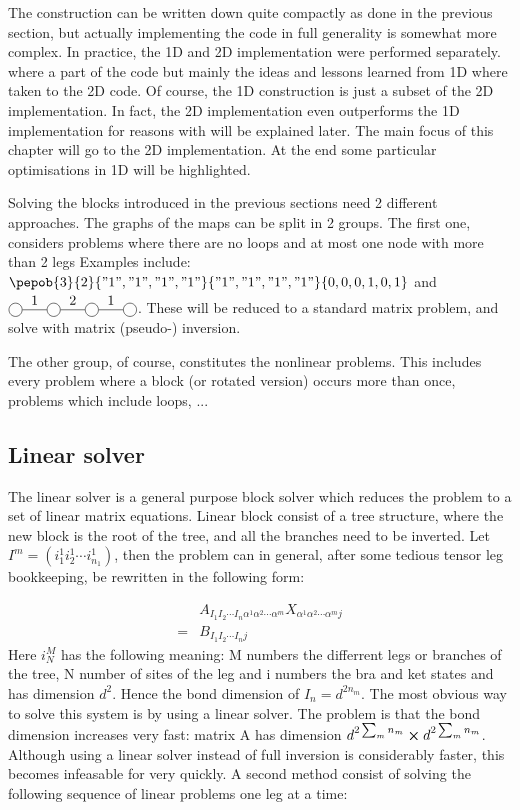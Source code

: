 The construction can be written down quite compactly as done in the previous section, but actually implementing the code in full generality is somewhat more complex. In practice, the 1D and 2D implementation were performed separately. where a part of the code but mainly the ideas and lessons learned from 1D where taken to the 2D code. Of course, the 1D construction is just a subset of the 2D implementation. In fact, the 2D implementation even outperforms the 1D implementation for reasons with will be explained later. The main focus of this chapter will go to the 2D implementation. At the end some particular optimisations in 1D will be highlighted.

Solving the blocks introduced in the previous sections need 2 different approaches. The graphs of the maps can be split in 2 groups. The first one, considers problems where there are no loops and at most one node with more than 2 legs Examples include:
$\pepob{3}{2}{{"1","1","1","1"}}{{"1","1","1","1"}}{{0,0,0,1,0,1}}$ and $\mpob{4}{ {,"1","2","1",}  }{}{}{}{{,,,,,}}$.
These will be reduced to a standard matrix problem, and solve with matrix (pseudo-) inversion.

The other group, of course, constitutes the nonlinear problems. This includes every problem where a block (or rotated version) occurs more than once, problems which include loops, ...

\subsection{Linear solver} \label{subsec:linear_solver}

The linear solver is a general purpose block solver which reduces the problem to a set of linear matrix equations. Linear block consist of a tree structure, where the new block is the root of the tree, and all the branches need to be inverted.  Let $ I^m = (i^1_1 i^1_2 \cdots i^1_{n_1})$, then the problem can in general, after some tedious tensor leg bookkeeping, be rewritten in the following form:

\begin{equation}
    \begin{split}
        &A_{ I_1  I_2 \cdots I_n \alpha^1 \alpha^2 \cdots \alpha^m   } X_{ \alpha^1 \alpha^2 \cdots \alpha^m j  } \\
        = &B_{  I_1  I_2 \cdots I_n   j }
    \end{split}
\end{equation}
Here $i^M_N$ has the following meaning: M numbers the differrent legs or branches of the tree, N number of sites of the leg and i numbers the bra and ket states and has dimension $d^2$. Hence the bond dimension of $I_n= d^{2 n_m }$. The most obvious way to solve this system is by using a linear solver. The problem is that the bond dimension increases very fast: matrix A has dimension $d^ {2 \sum_m n_m } \cross d^ {2 \sum_m n_m } $. Although using a linear solver instead of full inversion is considerably faster, this becomes infeasable for very quickly. A second method consist of solving the following sequence of linear problems one leg at a time:

